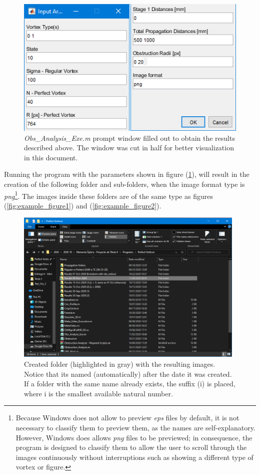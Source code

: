 \begin{figure}[htbp]
    \centering
    \includegraphics[scale=0.85]{images/c03/Input_Window_MATLAB_divided_v2.PNG}
    \caption{\textit{Obs\_Analysis\_Exe.m} prompt window filled out to obtain the results described above. The window was cut in half for better visualization in this document.}
    \label{fig:input_window}
\end{figure}

\newpage
Running the program with the parameters shown in figure (\ref{fig:input_window}), will result in the creation of the following folder and sub-folders, when the image format type is \textit{png}\footnote{Because Windows does not allow to preview \textit{eps} files by default, it is not necessary to classify them to preview them, as the names are self-explanatory. However, Windows does allows \textit{png} files to be previewed; in consequence, the program is designed to classify them to allow the user to scroll through the images continuously without interruptions such as showing a different type of vortex or figure.}. The images inside these folders are of the same type as figures (\ref{fig:example_figure1}) and (\ref{fig:example_figure2}).

\begin{figure}[htbp]
    \centering
    \includegraphics[width=11cm]{images/c03/General_Folder.PNG}
    \caption{Created folder (highlighted in gray) with the resulting images. Notice that its named (automatically) after the date it was created. If a folder with the same name already exists, the suffix (i) is placed, where i is the smallest available natural number.}
    \label{fig:general_folder}
\end{figure}

